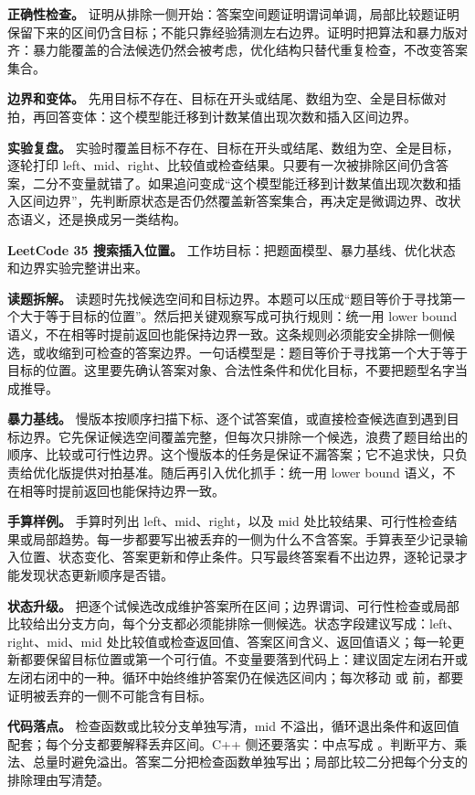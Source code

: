 \textbf{正确性检查。} 证明从排除一侧开始：答案空间题证明谓词单调，局部比较题证明保留下来的区间仍含目标；不能只靠经验猜测左右边界。证明时把算法和暴力版对齐：暴力能覆盖的合法候选仍然会被考虑，优化结构只替代重复检查，不改变答案集合。

\textbf{边界和变体。} 先用目标不存在、目标在开头或结尾、数组为空、全是目标做对拍，再回答变体：这个模型能迁移到计数某值出现次数和插入区间边界。

\textbf{实验复盘。} 实验时覆盖目标不存在、目标在开头或结尾、数组为空、全是目标，逐轮打印 left、mid、right、比较值或检查结果。只要有一次被排除区间仍含答案，二分不变量就错了。如果追问变成“这个模型能迁移到计数某值出现次数和插入区间边界”，先判断原状态是否仍然覆盖新答案集合，再决定是微调边界、改状态语义，还是换成另一类结构。

\noindent\textbf{LeetCode 35 搜索插入位置。} 工作坊目标：把题面模型、暴力基线、优化状态和边界实验完整讲出来。

\textbf{读题拆解。} 读题时先找候选空间和目标边界。本题可以压成“题目等价于寻找第一个大于等于目标的位置”。然后把关键观察写成可执行规则：统一用 lower bound 语义，不在相等时提前返回也能保持边界一致。这条规则必须能安全排除一侧候选，或收缩到可检查的答案边界。一句话模型是：题目等价于寻找第一个大于等于目标的位置。这里要先确认答案对象、合法性条件和优化目标，不要把题型名字当成推导。

\textbf{暴力基线。} 慢版本按顺序扫描下标、逐个试答案值，或直接检查候选直到遇到目标边界。它先保证候选空间覆盖完整，但每次只排除一个候选，浪费了题目给出的顺序、比较或可行性边界。这个慢版本的任务是保证不漏答案；它不追求快，只负责给优化版提供对拍基准。随后再引入优化抓手：统一用 lower bound 语义，不在相等时提前返回也能保持边界一致。

\textbf{手算样例。} 手算时列出 left、mid、right，以及 mid 处比较结果、可行性检查结果或局部趋势。每一步都要写出被丢弃的一侧为什么不含答案。手算表至少记录输入位置、状态变化、答案更新和停止条件。只写最终答案看不出边界，逐轮记录才能发现状态更新顺序是否错。

\textbf{状态升级。} 把逐个试候选改成维护答案所在区间；边界谓词、可行性检查或局部比较给出分支方向，每个分支都必须能排除一侧候选。状态字段建议写成：left、right、mid、mid 处比较值或检查返回值、答案区间含义、返回值语义；每一轮更新都要保留目标位置或第一个可行值。不变量要落到代码上：建议固定左闭右开或左闭右闭中的一种。循环中始终维护答案仍在候选区间内；每次移动  或  前，都要证明被丢弃的一侧不可能含有目标。

\textbf{代码落点。} 检查函数或比较分支单独写清，mid 不溢出，循环退出条件和返回值配套；每个分支都要解释丢弃区间。C++ 侧还要落实：中点写成 。判断平方、乘法、总量时避免溢出。答案二分把检查函数单独写出；局部比较二分把每个分支的排除理由写清楚。

